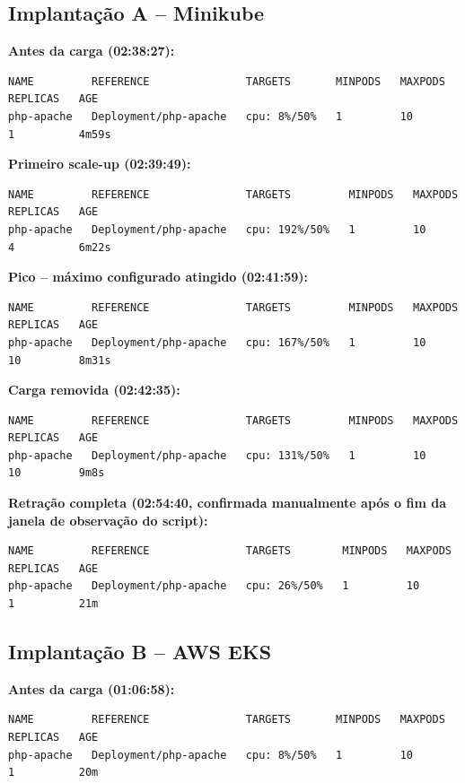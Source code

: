 \documentclass[12pt]{article}
\begin{document}
\subsection{Implantação A -- Minikube}

\textbf{Antes da carga (02:38:27):}
\begin{lstlisting}
NAME         REFERENCE               TARGETS       MINPODS   MAXPODS   REPLICAS   AGE
php-apache   Deployment/php-apache   cpu: 8%/50%   1         10        1          4m59s
\end{lstlisting}

\textbf{Primeiro scale-up (02:39:49):}
\begin{lstlisting}
NAME         REFERENCE               TARGETS         MINPODS   MAXPODS   REPLICAS   AGE
php-apache   Deployment/php-apache   cpu: 192%/50%   1         10        4          6m22s
\end{lstlisting}

\textbf{Pico -- máximo configurado atingido (02:41:59):}
\begin{lstlisting}
NAME         REFERENCE               TARGETS         MINPODS   MAXPODS   REPLICAS   AGE
php-apache   Deployment/php-apache   cpu: 167%/50%   1         10        10         8m31s
\end{lstlisting}

\textbf{Carga removida (02:42:35):}
\begin{lstlisting}
NAME         REFERENCE               TARGETS         MINPODS   MAXPODS   REPLICAS   AGE
php-apache   Deployment/php-apache   cpu: 131%/50%   1         10        10         9m8s
\end{lstlisting}

\textbf{Retração completa (02:54:40, confirmada manualmente após o fim da
janela de observação do script):}
\begin{lstlisting}
NAME         REFERENCE               TARGETS        MINPODS   MAXPODS   REPLICAS   AGE
php-apache   Deployment/php-apache   cpu: 26%/50%   1         10        1          21m
\end{lstlisting}

\subsection{Implantação B -- AWS EKS}

\textbf{Antes da carga (01:06:58):}
\begin{lstlisting}
NAME         REFERENCE               TARGETS       MINPODS   MAXPODS   REPLICAS   AGE
php-apache   Deployment/php-apache   cpu: 8%/50%   1         10        1          20m
\end{lstlisting}
\end{document}
